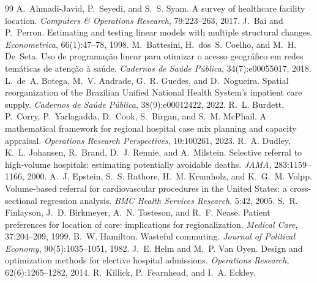 \documentclass[11pt]{article}
\begin{document}

\begin{thebibliography}{99}
A.~Ahmadi-Javid, P.~Seyedi, and S.~S. Syam.
\newblock A survey of healthcare facility location.
\newblock \emph{Computers \& Operations Research}, 79:223--263, 2017.
J.~Bai and P.~Perron.
\newblock Estimating and testing linear models with multiple structural changes.
\newblock \emph{Econometrica}, 66(1):47--78, 1998.
M.~Battesini, H.~dos~S. Coelho, and M.~H. De~Seta.
\newblock Uso de programa\c{c}\~ao linear para otimizar o acesso geogr\'afico em redes tem\'aticas de aten\c{c}\~ao \`a sa\'ude.
\newblock \emph{Cadernos de Sa\'ude P\'ublica}, 34(7):e00055017, 2018.
L.~de~A. Botega, M.~V. Andrade, G.~R. Guedes, and D.~Nogueira.
\newblock Spatial reorganization of the Brazilian Unified National Health System's inpatient care supply.
\newblock \emph{Cadernos de Sa\'ude P\'ublica}, 38(9):e00012422, 2022.
R.~L. Burdett, P.~Corry, P.~Yarlagadda, D.~Cook, S.~Birgan, and S.~M. McPhail.
\newblock A mathematical framework for regional hospital case mix planning and capacity appraisal.
\newblock \emph{Operations Research Perspectives}, 10:100261, 2023.
R.~A. Dudley, K.~L. Johansen, R.~Brand, D.~J. Rennie, and A.~Milstein.
\newblock Selective referral to high-volume hospitals: estimating potentially avoidable deaths.
\newblock \emph{JAMA}, 283:1159--1166, 2000.
A.~J. Epstein, S.~S. Rathore, H.~M. Krumholz, and K.~G.~M. Volpp.
\newblock Volume-based referral for cardiovascular procedures in the United States: a cross-sectional regression analysis.
\newblock \emph{BMC Health Services Research}, 5:42, 2005.
S.~R. Finlayson, J.~D. Birkmeyer, A.~N. Tosteson, and R.~F. Nease.
\newblock Patient preferences for location of care: implications for regionalization.
\newblock \emph{Medical Care}, 37:204--209, 1999.
B.~W. Hamilton.
\newblock Wasteful commuting.
\newblock \emph{Journal of Political Economy}, 90(5):1035--1051, 1982.
J.~E. Helm and M.~P. Van Oyen.
\newblock Design and optimization methods for elective hospital admissions.
\newblock \emph{Operations Research}, 62(6):1265--1282, 2014.
R.~Killick, P.~Fearnhead, and I.~A. Eckley.

\end{thebibliography}
\end{document}

